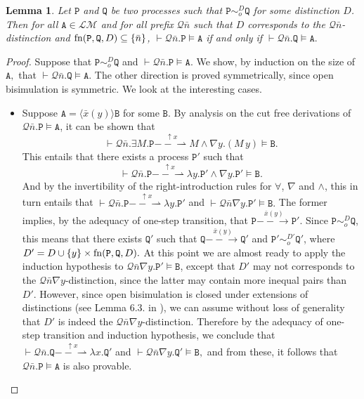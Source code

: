 \documentclass{acmtrans2m}
\newtheorem{lemma}[theorem]{Lemma}
\def\Lscr{{\mathcal L}}
\def\Mscr{{\mathcal M}}
\def\Qscr{{\mathcal Q}}
\def\Api{{\mathtt A}}
\def\Bpi{{\mathtt B}}
\def\Ppi{{\mathtt P}}
\def\Qpi{{\mathtt Q}}
\newcommand{\one  }[3]{#1\stackrel{#2}{-\!\!-\!\!\!\rightarrow    } #3}
\newcommand{\onep }[3]{#1\stackrel{#2}{-\!\!-\!\!\!\rightharpoonup} #3}
\newcommand{\outact}{\mathop{\uparrow}}
\newcommand{\fn}[1]{{\rm fn}(#1)}
\begin{document}
\begin{lemma}
\label{lm:ch-open-complete}
Let $\Ppi$ and $\Qpi$ be two processes such that $\Ppi \sim_o^D \Qpi$ for some distinction $D$.
Then for all $\Api \in \Lscr \Mscr$ and for all prefix $\Qscr \bar n$ such that
$D$ corresponds to the $\Qscr \bar n$-distinction and $\fn{\Ppi, \Qpi, D} \subseteq \{ \bar n\}$,
$\vdash \Qscr \bar n. \Ppi \models \Api$ if and only if 
$\vdash \Qscr \bar n. \Qpi \models \Api.$
\end{lemma}
\begin{proof}
Suppose that $\Ppi \sim_o^D \Qpi$ and $\vdash \Qscr \bar n. \Ppi \models \Api.$ 
We show, by induction on the size of $\Api,$
that  $\vdash \Qscr \bar n. \Qpi \models \Api.$ The other direction
is proved symmetrically, since open bisimulation is symmetric. 
We look at the interesting cases.
\begin{itemize}

\item Suppose $\Api = \langle \bar x(y) \rangle \Bpi$ for some $\Bpi.$
By analysis on the cut free derivations of $\Qscr \bar n. \Ppi \models \Api$, 
it can be shown that
$$
\vdash \Qscr \bar n. \exists M. \onep{\Ppi}{\outact x}{M} \land \nabla y. (M\,y) \models \Bpi.
$$
This entails that there exists a process $\Ppi'$ such that
$$
\vdash \Qscr \bar n. \onep{\Ppi}{\outact x}{\lambda y.\Ppi'} \land \nabla y. \Ppi' \models \Bpi.
$$
And by the invertibility of the right-introduction rules for $\forall$, $\nabla$ and $\land $, this in turn entails that
$
\vdash \Qscr \bar n. \onep{\Ppi}{\outact x}{\lambda y.\Ppi'}
$
and
$
\vdash \Qscr \bar n \nabla y. \Ppi' \models \Bpi.
$ The former implies, by the adequacy of one-step transition, that
$\one{\Ppi}{\bar x(y)}{\Ppi'}.$ Since $\Ppi \sim_o^D \Qpi$, this means
that there exists $\Qpi'$ such that $\one{\Qpi}{\bar x(y)}{\Qpi'}$ and
$\Ppi' \sim_o^{D'} \Qpi'$, where $D' = D \cup \{
y \} \times \fn{\Ppi,\Qpi,D}.$ At this point we are almost ready to
apply the induction hypothesis to $\Qscr \bar n\nabla
y.\Ppi' \models \Bpi$, except that $D'$ may not corresponds to the
$\Qscr \bar n \nabla y$-distinction, since the latter may contain more
inequal pairs than $D'$.  However, since open bisimulation is closed
under extensions of distinctions (see Lemma
6.3. in \cite{sangiorgi96acta}), we can assume without loss of
generality that $D'$ is indeed the $\Qscr \bar n\nabla
y$-distinction. Therefore by the adequacy of one-step transition and
induction hypothesis, we conclude that $
\vdash \Qscr \bar n. \onep{\Qpi}{\outact x}{\lambda x.\Qpi'}
$
and
$
\vdash \Qscr \bar n \nabla y. \Qpi' \models \Bpi,
$
and from these, it follows that $\Qscr \bar n. \Ppi \models \Api$ is also provable.


\end{itemize}
\end{proof}
\end{document}
